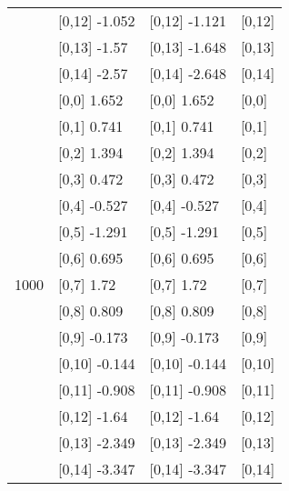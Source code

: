 \begin{table}
\begin{tabular}[t]{llll}
 & {}[0,12] -1.052 & {}[0,12] -1.121 & {}[0,12]\\
 & {}[0,13] -1.57 & {}[0,13] -1.648 & {}[0,13]\\
 & {}[0,14] -2.57 & {}[0,14] -2.648 & {}[0,14]\\
\addlinespace
 & {}[0,0] 1.652 & {}[0,0] 1.652 & {}[0,0]\\
 & {}[0,1] 0.741 & {}[0,1] 0.741 & {}[0,1]\\
 & {}[0,2] 1.394 & {}[0,2] 1.394 & {}[0,2]\\
 & {}[0,3] 0.472 & {}[0,3] 0.472 & {}[0,3]\\
 & {}[0,4] -0.527 & {}[0,4] -0.527 & {}[0,4]\\
\addlinespace
 & {}[0,5] -1.291 & {}[0,5] -1.291 & {}[0,5]\\
 & {}[0,6] 0.695 & {}[0,6] 0.695 & {}[0,6]\\
1000 & {}[0,7] 1.72 & {}[0,7] 1.72 & {}[0,7]\\
 & {}[0,8] 0.809 & {}[0,8] 0.809 & {}[0,8]\\
 & {}[0,9] -0.173 & {}[0,9] -0.173 & {}[0,9]\\
\addlinespace
 & {}[0,10] -0.144 & {}[0,10] -0.144 & {}[0,10]\\
 & {}[0,11] -0.908 & {}[0,11] -0.908 & {}[0,11]\\
 & {}[0,12] -1.64 & {}[0,12] -1.64 & {}[0,12]\\
 & {}[0,13] -2.349 & {}[0,13] -2.349 & {}[0,13]\\
 & {}[0,14] -3.347 & {}[0,14] -3.347 & {}[0,14]\\
\bottomrule
\end{tabular}
\end{table}
